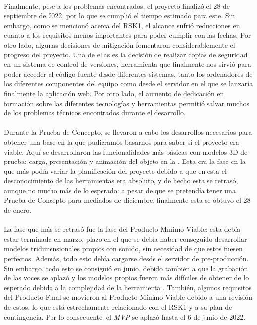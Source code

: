 \documentclass{subfiles}
\begin{document}
        \paragraph{}
        Finalmente, pese a los problemas encontrados, el proyecto finalizó el 28 de septiembre de 2022, por lo que se cumplió el tiempo estimado para este. Sin embargo, como se mencionó acerca del RSK1, el alcance sufrió reducciones en cuanto a los requisitos menos importantes para poder cumplir con las fechas. Por otro lado, algunas decisiones de mitigación fomentaron considerablemente el progreso del proyecto. Una de ellas es la decisión de realizar copias de seguridad en un sistema de control de versiones, herramienta que finalmente nos sirvió para poder acceder al código fuente desde diferentes sistemas, tanto los ordenadores de los diferentes componentes del equipo como desde el servidor en el que se lanzaría finalmente la aplicación web. Por otro lado, el aumento de dedicación en formación sobre las diferentes tecnologías y herramientas permitió salvar muchos de los problemas técnicos encontrados durante el desarrollo.

        \paragraph{}
        Durante la Prueba de Concepto, se llevaron a cabo los desarrollos necesarios para obtener una base en la que pudiéramos basarnos para saber si el proyecto era viable. Aquí se desarrollaron las funcionalidades más básicas con modelos 3D de prueba: carga, presentación y animación del objeto en la \ra. Esta era la fase en la que más podía variar la planificación del proyecto debido a que en esta el desconocimiento de las herramientas era absoluto, y de hecho esta se retrasó, aunque no mucho más de lo esperado: a pesar de que se pretendía tener una Prueba de Concepto para mediados de diciembre, finalmente esta se obtuvo el 28 de enero.

        \paragraph{}
        La fase que más se retrasó fue la fase del Producto Mínimo Viable: esta debía estar terminada en marzo, plazo en el que se debía haber conseguido desarrollar modelos tridimensionales propios con sonido, sin necesidad de que estos fuesen perfectos. Además, todo esto debía cargarse desde el servidor de pre-producción. Sin embargo, todo esto se consiguió en junio, debido también a que la grabación de las voces se aplazó y los modelos propios fueron más difíciles de obtener de lo esperado debido a la complejidad de la herramienta \blender. También, algunos requisitos del Producto Final se movieron al Producto Mínimo Viable debido a una revisión de estos, lo que está estrechamente relacionado con el RSK1 y a su plan de contingencia. Por lo consecuente, el \textit{MVP} se aplazó hasta el 6 de junio de 2022.
\end{document}
